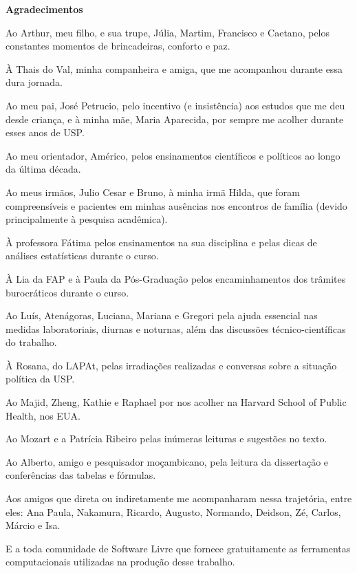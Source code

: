 \newpage

\begin{center}
  \textbf{Agradecimentos} 
\end{center}

Ao Arthur, meu filho, e sua trupe, Júlia, Martim, Francisco e Caetano, pelos 
constantes momentos de brincadeiras, conforto e paz.

À Thais do Val, minha companheira e amiga, que me acompanhou durante  
essa dura jornada.  

Ao meu pai, José Petrucio, pelo incentivo (e insistência) aos estudos que me deu desde criança, e à minha mãe, Maria Aparecida, por sempre me acolher durante esses anos de USP. 

Ao meu orientador, Américo, pelos ensinamentos científicos e políticos ao longo da última década. 

Ao meus irmãos, Julio Cesar e Bruno, à minha irmã Hilda, que foram compreensíveis e pacientes em minhas ausências nos encontros de família (devido principalmente à pesquisa acadêmica).  

À professora Fátima pelos ensinamentos na sua disciplina e pelas dicas de  
análises estatísticas durante o curso. 

À Lia da FAP e à Paula da Pós-Graduação pelos encaminhamentos dos trâmites burocráticos
durante o curso. 

Ao Luís, Atenágoras, Luciana, Mariana e Gregori pela ajuda essencial nas 
medidas laboratoriais, diurnas e noturnas, além das discussões técnico-científicas do trabalho. 

À Rosana, do LAPAt, pelas irradiações realizadas e conversas sobre a situação 
política da USP.  

Ao Majid, Zheng, Kathie e Raphael por nos acolher na Harvard School of Public 
Health, nos EUA.

Ao Mozart e a Patrícia Ribeiro pelas inúmeras leituras e sugestões no texto. 

Ao Alberto, amigo e pesquisador moçambicano, pela leitura da dissertação e conferências das tabelas e fórmulas. 

Aos amigos que direta ou indiretamente me acompanharam nessa trajetória, entre eles: 
Ana Paula, Nakamura, Ricardo, Augusto, Normando, Deidson, Zé, Carlos, Márcio e Isa.

E a toda comunidade de Software Livre que fornece gratuitamente as ferramentas computacionais utilizadas na produção desse trabalho. 
